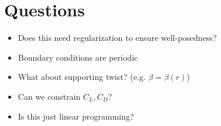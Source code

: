 \documentclass{article}
\begin{document}

\section{Questions}

\begin{itemize}
 \item Does this need regularization to ensure well-posedness?
 \item Boundary conditions are periodic
 \item What about supporting twist? (e.g. $\beta = \beta(r)$)
 \item Can we constrain $C_L, C_D$?
 \item Is this just linear programming?
\end{itemize}
\end{document}

